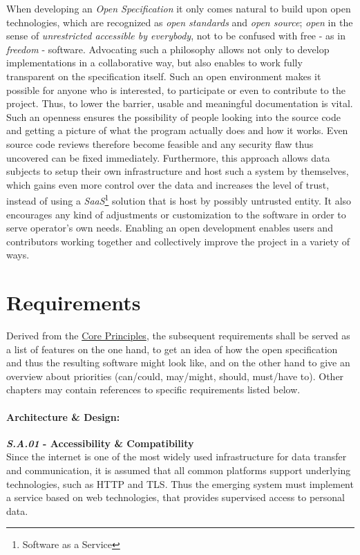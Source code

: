 \documentclass[12pt,english,a4paper,titlepage,cleardoublepage=empty,dottedtoc]{report}
\begin{document}
When developing an \emph{Open Specification} it only comes natural to
build upon open technologies, which are recognized as \emph{open
standards} and \emph{open source}; \emph{open} in the sense of
\emph{unrestricted accessible by everybody}, not to be confused with
free - as in \emph{freedom} - software. Advocating such a philosophy
allows not only to develop implementations in a collaborative way, but
also enables to work fully transparent on the specification itself. Such
an open environment makes it possible for anyone who is interested, to
participate or even to contribute to the project. Thus, to lower the
barrier, usable and meaningful documentation is vital. Such an openness
ensures the possibility of people looking into the source code and
getting a picture of what the program actually does and how it works.
Even source code reviews therefore become feasible and any security flaw
thus uncovered can be fixed immediately. Furthermore, this approach
allows data subjects to setup their own infrastructure and host such a
system by themselves, which gains even more control over the data and
increases the level of trust, instead of using a \emph{SaaS}\footnote{Software
  as a Service} solution that is host by possibly untrusted entity. It
also encourages any kind of adjustments or customization to the software
in order to serve operator's own needs. Enabling an open development
enables users and contributors working together and collectively improve
the project in a variety of ways.

\hypertarget{requirements}{\chapter{Requirements}\label{requirements}}

Derived from the \protect\hyperlink{core-principles}{Core Principles},
the subsequent requirements shall be served as a list of features on the
one hand, to get an idea of how the open specification and thus the
resulting software might look like, and on the other hand to give an
overview about priorities (can/could, may/might, should, must/have to).
Other chapters may contain references to specific requirements listed
below.

\subsubsection{Architecture \& Design:}\label{architecture-design}

\textbf{\emph{\protect\hypertarget{sa01}{}{S.A.01}} - Accessibility \&
Compatibility}\\
Since the internet is one of the most widely used infrastructure for
data transfer and communication, it is assumed that all common platforms
support underlying technologies, such as HTTP and TLS. Thus the emerging
system must implement a service based on web technologies, that provides
supervised access to personal data.
\end{document}
